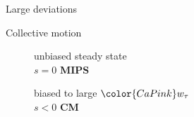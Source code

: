 \documentclass{beamer}
\begin{document}
\begin{frame}{Large deviations}

\end{frame}

\begin{frame}{Collective motion}


\begin{figure}
\begin{minipage}{0.48\linewidth}
\centering
unbiased steady state\\
$s = 0$
{\bf MIPS}
\end{minipage}
\hfill
\begin{minipage}{0.48\linewidth}
\centering
biased to large ${\color{CaPink} w_{\tau}}$\\
$s < 0$
{\bf CM}
\end{minipage}
\hfill\hfill
\end{figure}

\end{frame}
\end{document}
